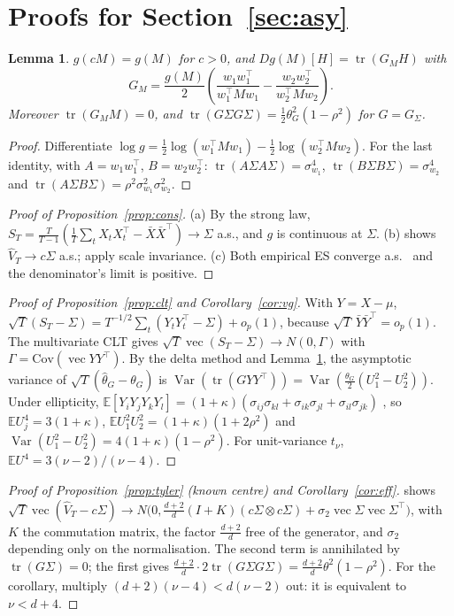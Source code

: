 \documentclass[11pt]{article}
\newcommand{\E}{\mathbb{E}}
\newcommand{\Var}{\operatorname{Var}}
\newcommand{\tr}{\operatorname{tr}}
\newcommand{\vecop}{\operatorname{vec}}
\newtheorem{lemma}{Lemma}
\theoremstyle{remark}
\begin{document}
\section{Proofs for Section~\ref{sec:asy}}\label{app:asy}

\begin{lemma}\label{lem:g}
$g(cM)=g(M)$ for $c>0$, and $Dg(M)[H]=\tr(G_MH)$ with
\[
G_M=\frac{g(M)}2\left(\frac{w_1w_1^\top}{w_1^\top Mw_1}-\frac{w_2w_2^\top}{w_2^\top Mw_2}\right).
\]
Moreover $\tr(G_MM)=0$, and $\tr(G\Sigma G\Sigma)=\frac12\theta_G^2(1-\rho^2)$ for $G=G_\Sigma$.
\end{lemma}

\begin{proof}
Differentiate $\log g=\frac12\log(w_1^\top Mw_1)-\frac12\log(w_2^\top Mw_2)$. For the last identity, with
$A=w_1w_1^\top$, $B=w_2w_2^\top$: $\tr(A\Sigma A\Sigma)=\sigma_{w_1}^4$, $\tr(B\Sigma B\Sigma)=\sigma_{w_2}^4$ and
$\tr(A\Sigma B\Sigma)=\rho^2\sigma_{w_1}^2\sigma_{w_2}^2$.
\end{proof}

\begin{proof}[Proof of Proposition~\ref{prop:cons}]
(a) By the strong law, $S_T=\frac T{T-1}(\frac1T\sum_tX_tX_t^\top-\bar X\bar X^\top)\to\Sigma$ a.s., and $g$ is
continuous at $\Sigma$. (b) \citet{tyler1987} shows $\hat V_T\to c\Sigma$ a.s.; apply scale invariance.
(c) Both empirical ES converge a.s.\ \citep{acerbi2002} and the denominator's limit is positive.
\end{proof}

\begin{proof}[Proof of Proposition~\ref{prop:clt} and Corollary~\ref{cor:vg}]
With $Y=X-\mu$, $\sqrt T(S_T-\Sigma)=T^{-1/2}\sum_t(Y_tY_t^\top-\Sigma)+o_p(1)$, because $\sqrt T\,\bar Y\bar Y^\top=o_p(1)$.
The multivariate CLT gives $\sqrt T\vecop(S_T-\Sigma)\to N(0,\Gamma)$ with $\Gamma=\mathrm{Cov}(\vecop YY^\top)$. By
the delta method and Lemma~\ref{lem:g}, the asymptotic variance of $\sqrt T(\hat\theta_G-\theta_G)$ is
$\Var(\tr(GYY^\top))=\Var(\frac{\theta_G}2(U_1^2-U_2^2))$. Under ellipticity,
$\E[Y_iY_jY_kY_l]=(1+\kappa)(\sigma_{ij}\sigma_{kl}+\sigma_{ik}\sigma_{jl}+\sigma_{il}\sigma_{jk})$ \citep{muirhead1982},
so $\E U_j^4=3(1+\kappa)$, $\E U_1^2U_2^2=(1+\kappa)(1+2\rho^2)$ and
$\Var(U_1^2-U_2^2)=4(1+\kappa)(1-\rho^2)$. For unit-variance $t_\nu$, $\E U^4=3(\nu-2)/(\nu-4)$.
\end{proof}

\begin{proof}[Proof of Proposition~\ref{prop:tyler} (known centre) and Corollary~\ref{cor:eff}]
\citet{tyler1987} shows
$\sqrt T\vecop(\hat V_T-c\Sigma)\to N\big(0,\frac{d+2}d(I+K)(c\Sigma\otimes c\Sigma)+\sigma_2\vecop\Sigma\vecop\Sigma^\top\big)$,
with $K$ the commutation matrix, the factor $\frac{d+2}d$ free of the generator, and $\sigma_2$ depending only on
the normalisation. The second term is annihilated by $\tr(G\Sigma)=0$; the first gives
$\frac{d+2}d\cdot2\tr(G\Sigma G\Sigma)=\frac{d+2}d\theta^2(1-\rho^2)$. For the corollary, multiply
$(d+2)(\nu-4)<d(\nu-2)$ out: it is equivalent to $\nu<d+4$.
\end{proof}
\end{document}
